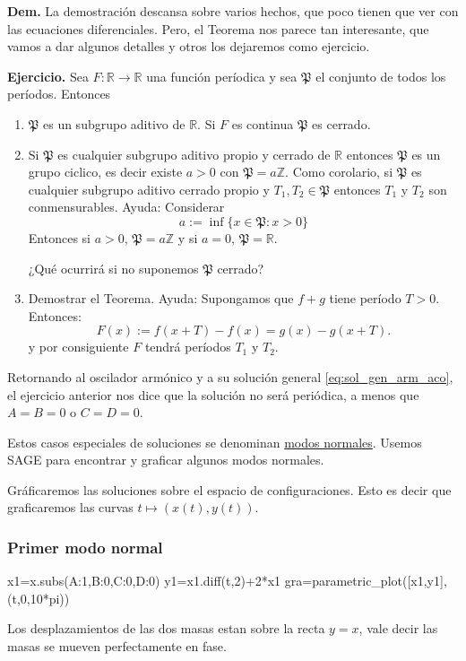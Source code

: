 \documentclass{article}
\newcommand{\rr}{\mathbb{R}}
\renewcommand{\emph}[1]{\textcolor[rgb]{1,0,0}{#1}}
\begin{document}
\textbf{Dem.} La demostración descansa sobre varios hechos, que poco tienen que ver con las ecuaciones diferenciales. Pero, el Teorema nos parece tan interesante, que vamos a dar algunos detalles y otros los dejaremos como ejercicio.


\textbf{Ejercicio.} Sea $F:\rr\to\rr$ una función períodica y sea $\mathfrak{P}$ el conjunto de todos los períodos. Entonces
\begin{enumerate}
 \item $\mathfrak{P}$ es un subgrupo aditivo  de $\rr$. Si $F$ es continua $\mathfrak{P}$ es cerrado. 
 \item Si $\mathfrak{P}$ es cualquier subgrupo aditivo propio y cerrado de $\rr$  entonces  $\mathfrak{P}$ es un grupo ciclico, es decir existe $a>0$ con $\mathfrak{P}=a\mathbb{Z}$.  Como corolario, si $\mathfrak{P}$ es cualquier subgrupo  aditivo cerrado propio  y $T_1,T_2\in \mathfrak{P}$ entonces $T_1$ y $T_2$ son conmensurables. \emph{Ayuda:} Considerar
\[a:=\inf\{x\in \mathfrak{P}:x>0\}\]
Entonces si $a>0$,  $\mathfrak{P}=a\mathbb{Z}$ y si $a=0$,  $\mathfrak{P}=\rr$. 

¿Qué ocurrirá si no suponemos $\mathfrak{P}$ cerrado? 

 \item Demostrar el Teorema. \emph{Ayuda:} Supongamos  que $f+g$ tiene período $T>0$. Entonces:
\[F(x):=f(x+T)-f(x)=g(x)-g(x+T).\]
y por consiguiente $F$ tendrá períodos $T_1$ y $T_2$. 
 \end{enumerate} 
 




Retornando al oscilador armónico y a su solución general \eqref{eq:sol_gen_arm_aco}, el ejercicio anterior nos dice  que la solución no será periódica, a menos que $A=B=0$ o $C=D=0$. 

Estos casos especiales de soluciones se denominan \href{http://es.wikipedia.org/wiki/Modo_normal}{modos normales}.  Usemos SAGE para encontrar y graficar algunos modos normales. 

Gráficaremos las soluciones sobre el espacio de configuraciones. Esto es decir que graficaremos las curvas $t\mapsto (x(t),y(t))$. 



 \subsubsection{Primer modo normal}

\begin{sageblock}
  x1=x.subs({A:1,B:0,C:0,D:0})
  y1=x1.diff(t,2)+2*x1
  gra=parametric_plot([x1,y1],(t,0,10*pi))
\end{sageblock}
 \begin{center}
 \end{center}
 Los desplazamientos de las dos masas estan sobre la recta $y=x$, vale decir las masas se mueven perfectamente en fase.
\end{document}
